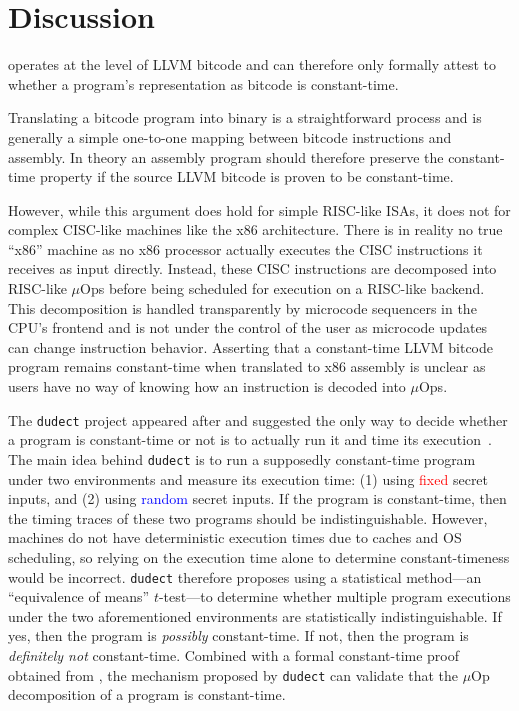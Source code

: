 \section{Discussion}\label{sec:discussion}

\ctVerif operates at the level of LLVM bitcode and can therefore only formally attest to whether a program's
representation as bitcode is constant-time.

Translating a bitcode program into binary is a straightforward process and is generally a simple one-to-one mapping between bitcode instructions and assembly.
In theory an assembly program should therefore preserve the constant-time property if the source LLVM bitcode is proven to be constant-time.

However, while this argument does hold for simple RISC-like ISAs, it does not for complex CISC-like machines like the x86 architecture.
There is in reality no true ``x86'' machine as no x86 processor actually executes the CISC instructions it receives as input directly.
Instead, these CISC instructions are decomposed into RISC-like $\mu$Ops before being scheduled for execution on a RISC-like backend.
This decomposition is handled transparently by microcode sequencers in the CPU's frontend and is not under the control of the user as microcode updates can change instruction behavior.
Asserting that a constant-time LLVM bitcode program remains constant-time when translated to x86 assembly is unclear as users have no way of knowing how an instruction is decoded into $\mu$Ops.

The \texttt{dudect} project appeared after \ctVerif and suggested the only way to decide whether a program is constant-time or not is to actually run it and time its execution~\cite{dudect}.
The main idea behind \texttt{dudect} is to run a supposedly constant-time program under two environments and measure its execution time: (1) using \textcolor{red}{fixed} secret inputs, and (2) using \textcolor{blue}{random} secret inputs.
If the program is constant-time, then the timing traces of these two programs should be indistinguishable.
However, machines do not have deterministic execution times due to caches and OS scheduling, so relying on the execution time alone to determine constant-timeness would be incorrect.
\texttt{dudect} therefore proposes using a statistical method---an ``equivalence of means'' $t$-test---to determine whether multiple program executions under the two aforementioned environments are statistically indistinguishable.
If yes, then the program is \emph{possibly} constant-time. If not, then the program is \emph{definitely not} constant-time.
Combined with a formal constant-time proof obtained from \ctVerif, the mechanism proposed by \texttt{dudect} can validate that the $\mu$Op decomposition of a program is constant-time.


